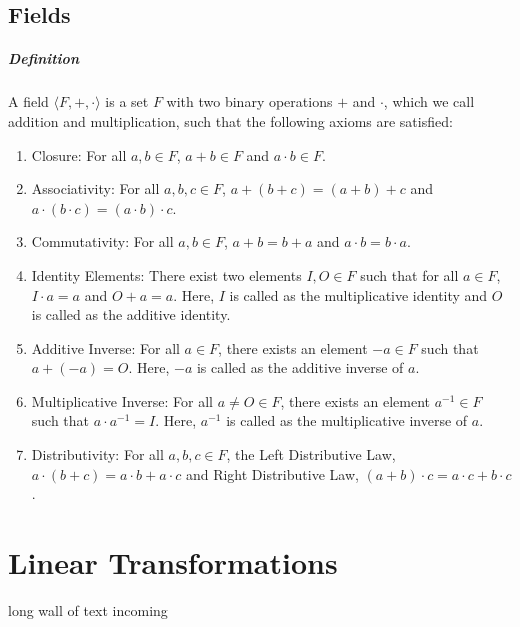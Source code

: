 \documentclass[12pt, oneside]{book}
\begin{document}
\section{Fields}
\paragraph{Definition} A field \( \langle F, +, \cdot \rangle \) is a set \( F \) with two binary operations \( + \) and \( \cdot \), which we call addition and multiplication, such that the following axioms are satisfied:
\begin{enumerate}
    \item Closure: For all \( a, b \in F \), \( a + b \in F \) and \( a \cdot b \in F \).
    \item Associativity: For all \( a, b, c \in F \), \( a + (b + c) = (a + b) + c \) and \( a \cdot (b \cdot c) = (a \cdot b) \cdot c \).
    \item Commutativity: For all \( a, b \in F \), \( a + b = b + a \) and \( a \cdot b = b \cdot a \).
    \item Identity Elements: There exist two elements \(I, O \in F\) such that for all \( a \in F \), \(I \cdot a = a \) and \( O + a = a \). Here, \( I \) is called as the multiplicative identity and \( O \) is called as the additive identity.
    \item Additive Inverse: For all \( a \in F \), there exists an element \( -a \in F \) such that \( a + (-a) = O \). Here, \( -a \) is called as the additive inverse of \( a \).
    \item Multiplicative Inverse: For all \( a \neq O \in F \), there exists an element \( a^{-1} \in F \) such that \( a \cdot a^{-1} = I \). Here, \( a^{-1} \) is called as the multiplicative inverse of \( a \).
    \item Distributivity: For all \( a, b, c \in F \), the Left Distributive Law, \( a \cdot (b + c) = a \cdot b + a \cdot c \) and Right Distributive Law, \( (a + b) \cdot c = a \cdot c + b \cdot c \).
\end{enumerate}
\chapter{Linear Transformations}
long wall of text incoming
\end{document}
